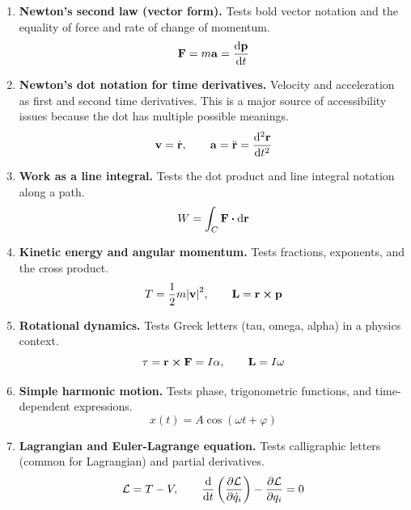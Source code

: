 \documentclass[11pt]{article}
\begin{document}
\begin{enumerate}

\item \textbf{Newton's second law (vector form).}
Tests bold vector notation and the equality of force and rate of change
of momentum.
\[
  \vb{F} = m\vb{a} = \dv{\vb{p}}{t}
\]

\item \textbf{Newton's dot notation for time derivatives.}
Velocity and acceleration as first and second time derivatives. This is
a major source of accessibility issues because the dot has multiple
possible meanings.
\[
  \vb{v} = \dot{\vb{r}}, \qquad
  \vb{a} = \ddot{\vb{r}} = \dv[2]{\vb{r}}{t}
\]

\item \textbf{Work as a line integral.}
Tests the dot product and line integral notation along a path.
\[
  W = \int_C \vb{F} \vdot \dd{\vb{r}}
\]

\item \textbf{Kinetic energy and angular momentum.}
Tests fractions, exponents, and the cross product.
\[
  T = \frac{1}{2}m\abs{\vb{v}}^2, \qquad
  \vb{L} = \vb{r} \cross \vb{p}
\]

\item \textbf{Rotational dynamics.}
Tests Greek letters (tau, omega, alpha) in a physics context.
\[
  \vb{\tau} = \vb{r} \cross \vb{F} = I\vb{\alpha},
  \qquad
  \vb{L} = I\vb{\omega}
\]

\item \textbf{Simple harmonic motion.}
Tests phase, trigonometric functions, and time-dependent expressions.
\[
  x(t) = A\cos(\omega t + \varphi)
\]

\item \textbf{Lagrangian and Euler-Lagrange equation.}
Tests calligraphic letters (common for Lagrangian) and partial derivatives.
\[
  \mathcal{L} = T - V, \qquad
  \dv{t}\left(\pdv{\mathcal{L}}{\dot{q}_i}\right)
  - \pdv{\mathcal{L}}{q_i} = 0
\]


\end{enumerate}
\end{document}
